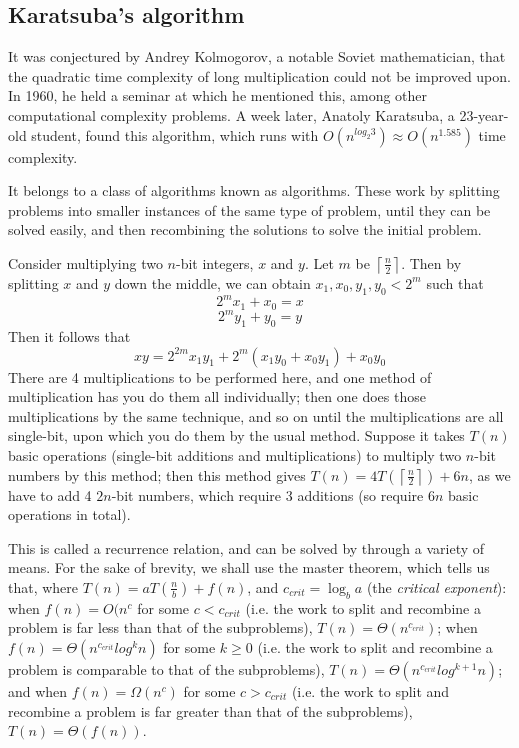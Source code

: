 \documentclass[12pt,a4paper]{report}
\begin{document}
\begin{multicols}{2}
\subsection{Karatsuba's algorithm}

It was conjectured by Andrey Kolmogorov, a notable Soviet mathematician, that the quadratic time complexity of long multiplication could not be improved upon. In 1960, he held a seminar at which he mentioned this, among other computational complexity problems. A week later, Anatoly Karatsuba, a 23-year-old student, found this algorithm, which runs with \(O(n^{log_{2}3})\approx{}O(n^{1.585})\) time complexity.

It belongs to a class of algorithms known as  algorithms. These work by splitting problems into smaller instances of the same type of problem, until they can be solved easily, and then recombining the solutions to solve the initial problem.

Consider multiplying two \(n\)-bit integers, \(x\) and \(y\). Let \(m\) be \(\left\lceil\frac{n}{2}\right\rceil\). Then by splitting \(x\) and \(y\) down the middle, we can obtain \(x_1,x_0,y_1,y_0<2^m\) such that \[2^{m}x_1+x_0=x\]\[2^{m}y_1+y_0=y\]
Then it follows that \[xy=2^{2m}x_1y_1+2^m(x_1y_0+x_0y_1)+x_0y_0\]
There are 4 multiplications to be performed here, and one method of multiplication has you do them all individually; then one does those multiplications by the same technique, and so on until the multiplications are all single-bit, upon which you do them by the usual method. Suppose it takes \(T(n)\) basic operations (single-bit additions and multiplications) to multiply two \(n\)-bit numbers by this method; then this method gives \(T(n)=4T(\left\lceil{}\frac{n}{2}\right\rceil{})+6n\), as we have to add 4 \(2n\)-bit numbers, which require 3 additions (so require \(6n\) basic operations in total).

This is called a recurrence relation, and can be solved by through a variety of means. For the sake of brevity, we shall use the master theorem, which tells us that, where \(T(n)=aT(\frac{n}{b})+f(n)\), and \(c_{crit}=\log_ba\) (the \textit{critical exponent}): when \(f(n)=O(n^c\) for some \(c<c_{crit}\) (i.e. the work to split and recombine a problem is far less than that of the subproblems), \(T(n)=\Theta(n^{c_{crit}})\); when \(f(n)=\Theta(n^{c_{crit}}log^kn)\) for some \(k\geq0\) (i.e. the work to split and recombine a problem is comparable to that of the subproblems), \(T(n)=\Theta(n^{c_{crit}}log^{k+1}n)\); and when \(f(n)=\Omega(n^c)\) for some \(c>c_{crit}\) (i.e. the work to split and recombine a problem is far greater than that of the subproblems), \(T(n)=\Theta(f(n))\).


\end{multicols}
\end{document}
